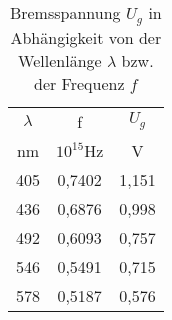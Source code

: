 \begin{table}[h!]
  \centering
  \caption{Bremsspannung $U_g$ in Abhängigkeit von der Wellenlänge $\lambda$ bzw. der Frequenz $f$}
  \label{tab:hdurchenull}
  \begin{tabular}{c c c}
    \toprule
      $\lambda$ & f  & $U_g$ \\
      nm        & $10^{15}$Hz & V \\
    \midrule
    405 & 0,7402 & 1,151 \\
    436 & 0,6876 & 0,998 \\
    492 & 0,6093 & 0,757 \\
    546 & 0,5491 & 0,715 \\
    578 & 0,5187 & 0,576 \\






    \bottomrule
  \end{tabular}
\end{table}
